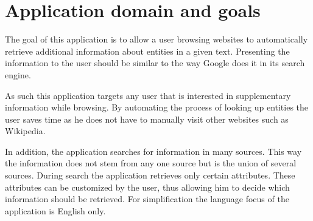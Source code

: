 \section{Application domain and goals}
The goal of this application is to allow a user browsing websites to automatically retrieve additional information about entities in a given text. Presenting the information to the user should be similar to the way Google does it in its search engine. 

As such this application targets any user that is interested in supplementary information while browsing. By automating the process of looking up entities the user saves time as he does not have to manually visit other websites such as Wikipedia. 

In addition, the application searches for information in many sources. This way the information does not stem from any one source but is the union of several sources.  During search the application retrieves only certain attributes. These attributes can be customized by the user, thus allowing him to decide which information should be retrieved. For simplification the language focus of the application is English only.